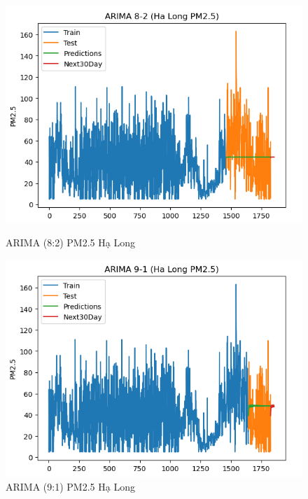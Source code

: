 \begin{figure}[h]
\begin{minipage}[b]{0.45\linewidth}
        \includegraphics[width=\linewidth]{img/ARIMA_8_2_HL.png}
        \caption{\scriptsize ARIMA (8:2) PM2.5 Hạ Long}
        \label{fig1}
    \end{minipage}\hfill
    \begin{minipage}[b]{0.45\linewidth}
        \centering
        \includegraphics[width=\linewidth]{img/ARIMA_9_1_HL.png}
        \caption{\scriptsize ARIMA (9:1) PM2.5 Hạ Long}
        \label{fig2}
    \end{minipage}
        \begin{minipage}[b]{0.45\linewidth}
        \centering

\end{minipage}
\end{figure}
